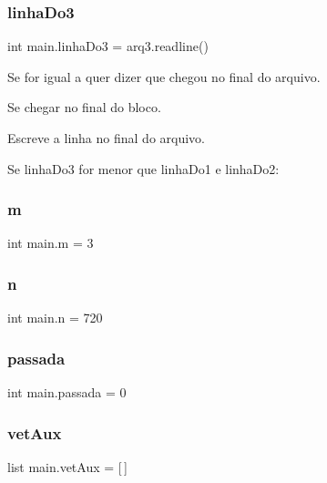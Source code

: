 \subsubsection{\texorpdfstring{linha\+Do3}{linhaDo3}}
{\footnotesize\ttfamily int main.\+linha\+Do3 = arq3.\+readline()}



Se for igual a \textquotesingle{}\textquotesingle{} quer dizer que chegou no final do arquivo. 

Se chegar no final do bloco.

Escreve a linha no final do arquivo.

Se linha\+Do3 for menor que linha\+Do1 e linha\+Do2\+: \mbox{\label{namespacemain_a50c080bda584bdba1da281d098982aef}} 
\subsubsection{\texorpdfstring{m}{m}}
{\footnotesize\ttfamily int main.\+m = 3}

\mbox{\label{namespacemain_ad1293b340a9cdf1c72fff26349ffd01b}} 
\subsubsection{\texorpdfstring{n}{n}}
{\footnotesize\ttfamily int main.\+n = 720}

\mbox{\label{namespacemain_a457d8cc2a11d76334da726a2dd1e5218}} 
\subsubsection{\texorpdfstring{passada}{passada}}
{\footnotesize\ttfamily int main.\+passada = 0}

\mbox{\label{namespacemain_a7499c72081b7c9814c7d9be3410e2253}} 
\subsubsection{\texorpdfstring{vet\+Aux}{vetAux}}
{\footnotesize\ttfamily list main.\+vet\+Aux = \mbox{[}$\,$\mbox{]}}

